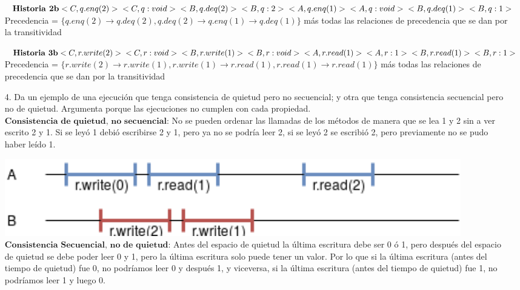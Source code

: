 \documentclass[12pt, letterpaper]{article}
\begin{document}
\begin{itemize}
$\textbf{Historia 2b}\\
<C, q.enq(2)>\\
<C, q:void>\\
<B, q.deq(2)>\\
<B, q:2>\\
<A, q.enq(1)>\\
<A, q:void>\\
<B, q.deq(1)>\\
<B, q:1>\\
$\\
Precedencia = $\{q.enq(2) \rightarrow q.deq(2), q.deq(2) \rightarrow q.enq(1) \rightarrow q.deq(1) \}$ más todas las relaciones de precedencia que se dan por la transitividad

$\textbf{Historia 3b}\\
<C, r.write(2)>\\
<C, r:void>\\
<B, r.write(1)>\\
<B, r:void>\\
<A, r.read(1)>\\
<A, r:1>\\
<B, r.read(1)>\\
<B, r:1>\\
$\\
Precedencia = $\{ r.write(2) \rightarrow r.write(1), r.write(1) \rightarrow r.read(1), r.read(1) \rightarrow r.read(1)\}$ más todas las relaciones de precedencia que se dan por la transitividad

\item[4. ] Da un ejemplo de una ejecución que tenga consistencia de quietud pero no secuencial; y otra que tenga consistencia secuencial pero no de quietud. Argumenta porque las ejecuciones no cumplen con cada propiedad.\\
$\textbf{Consistencia de quietud, no secuencial}$: No se pueden ordenar las llamadas de los métodos de manera que se lea 1 y 2 sin a ver escrito 2 y 1. Si se leyó 1 debió escribirse 2 y 1, pero ya no se podría leer 2, si se leyó 2 se escribió 2, pero previamente no se pudo haber leído 1.

\includegraphics[width=0.9\textwidth]{4_1.png}\\

$\textbf{Consistencia Secuencial, no de quietud}$: Antes del espacio de quietud la última escritura debe ser 0 ó 1, pero después del espacio de quietud se debe poder leer 0 y 1, pero la última escritura solo puede tener un valor. Por lo que si la última escritura (antes del tiempo de quietud) fue 0, no podríamos leer 0 y después 1, y viceversa, si la última escritura (antes del tiempo de quietud) fue 1, no podríamos leer 1 y luego 0.


\end{itemize}
\end{document}
